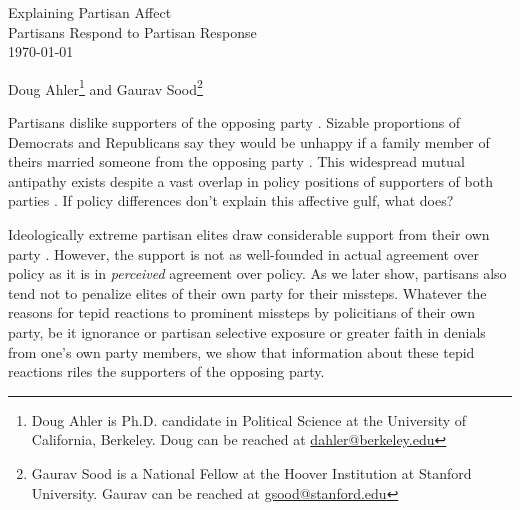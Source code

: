 \documentclass[12pt]{article}
\renewcommand{\thefootnote}{\fnsymbol{footnote}}
\begin{document}
\doublespacing
\vspace{2cm}

\begin{center}
Explaining Partisan Affect\\Partisans Respond to Partisan Response\\ 
\vspace{2cm}
\today\\\vspace{2cm}

Doug Ahler\footnote{Doug Ahler is Ph.D. candidate in Political Science at the
University of California, Berkeley. Doug can be reached at
\href{mailto:dahler@berkeley.edu}{dahler@berkeley.edu}} and Gaurav
Sood\footnote{Gaurav Sood is a National Fellow at the Hoover Institution at
Stanford University. Gaurav can be reached at
\href{mailto:gsood@stanford.edu}{gsood@stanford.edu}}

\end{center}

\setcounter{page}{0}
\thispagestyle{empty}
\renewcommand*{\thefootnote}{\arabic{footnote}}
\newpage
\setcounter{footnote}{1}


\begin{comment}
	sweaver(paste0(basedir, "xperceive/partisanResponse/manuscript"), "presponse")
\end{comment}
\newpage

Partisans dislike supporters of the opposing party \citep{iyengar2012,
iyengar2013}. Sizable proportions of Democrats and Republicans say they would be
unhappy if a family member of theirs married someone from the opposing party
\citep{iyengar2012}. This widespread mutual antipathy exists despite a vast overlap in policy positions of supporters of both parties \citep{fiorina2012}. If policy differences don't explain this affective gulf, what does?

Ideologically extreme partisan elites draw considerable support from their own
party \citep{sood2013}. However, the support is not as well-founded in actual
agreement over policy as it is in \textit{perceived} agreement over policy. As
we later show, partisans also tend not to penalize elites of their own party for
their missteps. Whatever the reasons for tepid reactions to prominent missteps
by policitians of their own party, be it ignorance or partisan
selective exposure or greater faith in denials from one's own party
members, we show that information about these tepid reactions riles the
supporters of the opposing party.
\end{document}
